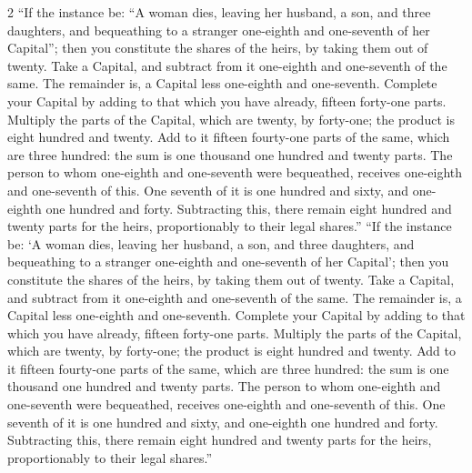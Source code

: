 \documentclass[10pt,a4paper]{article}
\renewcommand{\switchcolumn}{\syncronize\nointerlineskip\columnbreak}
\newcommand{\enquote}[1]{``#1''}
\begin{document}
\begin{paracol}{2}
\enquote{If the instance be: \enquote{A woman dies, leaving her husband, a son, and three daughters, and bequeathing to a stranger one-eighth and one-seventh of her Capital}; then you constitute the shares of the heirs, by taking them out of twenty. Take a Capital, and subtract from it one-eighth and one-seventh of the same. The remainder is, a Capital less one-eighth and one-seventh. Complete your Capital by adding to that which you have already, fifteen forty-one parts. Multiply the parts of the Capital, which are twenty, by forty-one; the product is eight hundred and twenty. Add to it fifteen fourty-one parts of the same, which are three hundred: the sum is one thousand one hundred and twenty parts. The person to whom one-eighth and one-seventh were bequeathed, receives one-eighth and one-seventh of this. One seventh of it is one hundred and sixty, and one-eighth one hundred and forty. Subtracting this, there remain eight hundred and twenty parts for the heirs, proportionably to their legal shares.}
\switchcolumn
``If the instance be: `A woman dies, leaving her husband, a son, and three daughters, and bequeathing to a stranger one-eighth and one-seventh of her Capital'; then you constitute the shares of the heirs, by taking them out of twenty. Take a Capital, and subtract from it one-eighth and one-seventh of the same. The remainder is, a Capital less one-eighth and one-seventh. Complete your Capital by adding to that which you have already, fifteen forty-one parts. Multiply the parts of the Capital, which are twenty, by forty-one; the product is eight hundred and twenty. Add to it fifteen fourty-one parts of the same, which are three hundred: the sum is one thousand one hundred and twenty parts. The person to whom one-eighth and one-seventh were bequeathed, receives one-eighth and one-seventh of this. One seventh of it is one hundred and sixty, and one-eighth one hundred and forty. Subtracting this, there remain eight hundred and twenty parts for the heirs, proportionably to their legal shares.''
\end{paracol}
\end{document}
